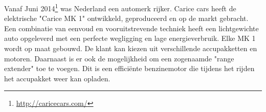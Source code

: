 Vanaf Juni 2014\footnote{\url{http://caricecars.com/}} was Nederland een automerk rijker. Carice cars heeft de elektrische "Carice MK 1" ontwikkeld, geproduceerd en op de markt gebracht. 
Een combinatie van eenvoud en vooruitstrevende techniek heeft een lichtgewichte auto opgeleverd met een perfecte wegligging en lage energieverbruik. 
\newline
Elke MK 1 wordt op maat gebouwd. De klant kan kiezen uit verschillende accupakketten en motoren. Daarnaast is er ook de mogelijkheid om een zogenaamde "range extender" toe te voegen. Dit is een efficiënte benzinemotor die tijdens het rijden het accupakket weer kan opladen. 
\newline
